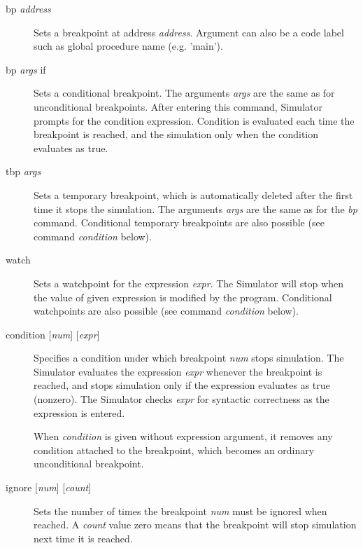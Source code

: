 \documentclass[a4paper,twoside]{tceusermanual}
\begin{document}
\begin{description}
\item[bp \emph{address}] %
  Sets a breakpoint at address \emph{address}. Argument can also be a code
  label such as global procedure name (e.g. 'main').
\item[bp \emph{args} if] %
  Sets a conditional breakpoint.  The arguments \emph{args} are the same as
  for unconditional breakpoints.  After entering this command, Simulator
  prompts for the condition expression. Condition is evaluated each time 
  the breakpoint is reached, and the simulation only when the condition 
  evaluates as true.
\item[tbp \emph{args}] %
  Sets a temporary breakpoint, which is automatically deleted after the
  first time it stops the simulation.  The arguments \emph{args} are the
  same as for the \emph{bp} command.  Conditional temporary breakpoints
  are also possible (see command \emph{condition} below).
\item[watch] %
  Sets a watchpoint for the expression \emph{expr}.  The Simulator will stop
  when the value of given expression is modified by the program.
  Conditional watchpoints are also possible (see command \emph{condition}
  below). 
\item[condition {[\emph{num}] [\emph{expr}]}] %
  Specifies a condition under which breakpoint \emph{num} stops simulation.
  The Simulator evaluates the expression \emph{expr} whenever the breakpoint
  is reached, and stops simulation only if the expression evaluates as true
  (nonzero).  The Simulator checks \emph{expr} for syntactic correctness as
  the expression is entered.

  When \emph{condition} is given without expression argument, it removes any
  condition attached to the breakpoint, which becomes an ordinary
  unconditional breakpoint.
\item[ignore {[\emph{num}] [\emph{count}]}] %
  Sets the number of times the breakpoint \emph{num} must be ignored when
  reached.  A \emph{count} value zero means that the breakpoint will stop
  simulation next time it is reached.


\end{description}
\end{document}
